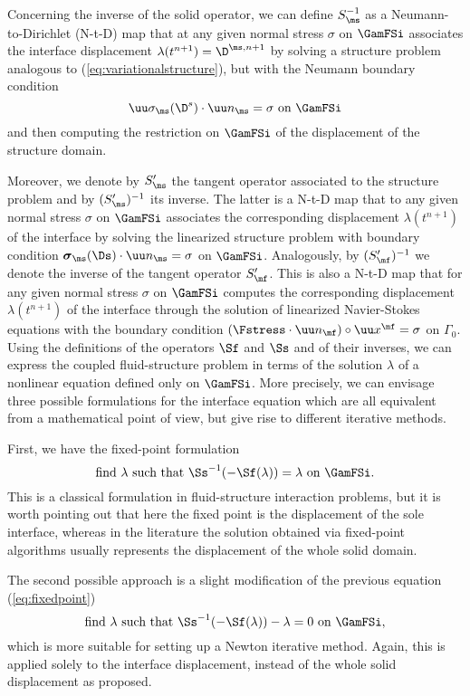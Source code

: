 Concerning the inverse of the solid operator, we can define $S_\ms^{-1}$ as a Neumann-to-Dirichlet
(N-t-D) map that at any given normal stress $\sigma$ on $\GamFSi$ associates the interface
displacement $\lambda(t^{n+1}) = \D^{\ms,n+1}$ by solving a structure problem analogous to
(\ref{eq:variationalstructure}), but with the Neumann boundary condition
\begin{equation*}
\uu \sigma_\ms(\D^s) \cdot\uu n_\ms = \sigma \textrm{ on } \GamFSi
\end{equation*}
and then computing the restriction on $\GamFSi$ of the displacement of
the structure domain.

Moreover, we denote by $S_\ms'$ the tangent operator associated to the structure problem and by
$(S_\ms')^{-1}$ its inverse. The latter is a N-t-D map that to any given normal stress $\sigma$ on
$\GamFSi$ associates the corresponding displacement $\lambda(t^{n+1})$ of the interface by solving
the linearized structure problem with boundary condition $\boldsymbol{\sigma}_\ms (\Ds) \cdot \uu
n_\ms = \sigma$ on $\GamFSi$. Analogously, by $(S_\mf')^{-1}$ we denote the inverse of the tangent
operator $S_\mf'$. This is also a N-t-D map  that for any given normal stress $\sigma$ on $\GamFSi$
computes the corresponding displacement $\lambda(t^{n+1})$ of the interface through the solution of
linearized Navier-Stokes equations with the boundary condition $(\Fstress \cdot {\uu n}_\mf) \circ
\uu x^{\mf} = \sigma$ on $\Gamma_0$.
Using the definitions of the operators $\Sf$ and $\Ss$ and of their inverses, we can express the
coupled fluid-structure problem in terms of the solution $\lambda$ of a nonlinear equation defined
only on $\GamFSi$. More precisely, we can envisage three possible formulations for the interface
equation which are all equivalent from a mathematical point of view, but give rise to different
iterative methods.

First, we have the fixed-point formulation
\begin{equation} \label{eq:fixedpoint}
\mbox{find } \lambda \mbox { such that } \Ss^{-1}(-\Sf(\lambda)) = \lambda
\mbox{ on } \GamFSi .
\end{equation}
This is a classical formulation in fluid-structure interaction problems, but it is worth pointing
out that here the fixed point is the displacement of the sole interface, whereas in the
literature the solution obtained via
fixed-point algorithms usually represents the displacement of the whole solid domain.

The second possible approach is a slight modification of the previous equation
(\ref{eq:fixedpoint})
\begin{equation} \label{eq:newton}
\mbox{find } \lambda \mbox { such that } \Ss^{-1}(-\Sf(\lambda)) - \lambda = 0 \mbox{ on } \GamFSi,
\end{equation}
which is more suitable for setting up a Newton iterative method.
Again, this is applied solely to the interface displacement,
instead of the whole solid displacement as proposed.

